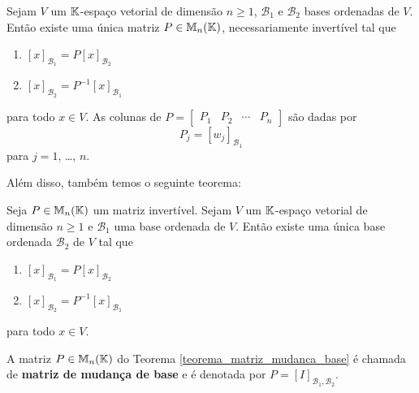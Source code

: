 \begin{teorema}\label{teorema_mudanca_base}
    Sejam $V$ um $\mathbb{K}$-espaço vetorial de dimensão $n \ge 1$, $\mathcal{B}_1$ e $\mathcal{B}_2$ bases ordenadas de $V$. Então existe uma única matriz $P \in \mathbb{M}_n(\mathbb{K})$, necessariamente invertível tal que
    \begin{enumerate}[label={\roman*})]
        \item $[x]_{\mathcal{B}_1} = P[x]_{\mathcal{B}_2}$
        \item $[x]_{\mathcal{B}_2} = P^{-1}[x]_{\mathcal{B}_1}$
    \end{enumerate}
    para todo $x \in V$. As colunas de $P = \begin{bmatrix}
    P_1 & P_2 & \cdots & P_n
    \end{bmatrix}$ são dadas por
    \[
        P_j = [w_j]_{\mathcal{B}_1}
    \]
    para $j = 1$, \dots, $n$.
\end{teorema}

Além disso, também temos o seguinte teorema:

\begin{teorema}\label{teorema_matriz_mudanca_base}
    Seja $P \in \mathbb{M}_n(\mathbb{K})$ um matriz invertível. Sejam $V$ um $\mathbb{K}$-espaço vetorial de dimensão $n \ge 1$ e $\mathcal{B}_1$ uma base ordenada de $V$. Então existe uma única base ordenada $\mathcal{B}_2$ de $V$ tal que
    \begin{enumerate}[label={\roman*})]
        \item $[x]_{\mathcal{B}_1} = P[x]_{\mathcal{B}_2}$
        \item $[x]_{\mathcal{B}_2} = P^{-1}[x]_{\mathcal{B}_1}$
    \end{enumerate}
    para todo $x \in V$.
\end{teorema}

\begin{definicao}
    A matriz $P \in \mathbb{M}_n(\mathbb{K})$ do Teorema \ref{teorema_matriz_mudanca_base} é chamada de \textbf{matriz de mudança de base} e é denotada por $P = [I]_{{\mathcal{B}_1},{\mathcal{B}_2}}$.
\end{definicao}

